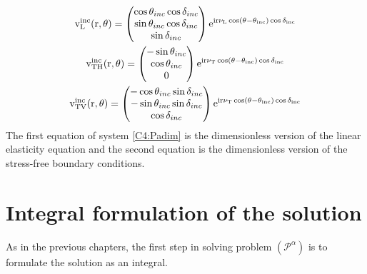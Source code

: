\begin{multline}
\rm v_L^{inc}(r,\theta)=\begin{pmatrix}
\cos \theta_{inc}\cos\delta_{inc} \\
\sin \theta_{inc}\cos\delta_{inc} \\
\sin\delta_{inc}
\end{pmatrix} e^{ir\nu_L \cos(\theta-\theta_{inc})\cos\delta_{inc}}
\\
\rm v_{TH}^{inc}(r,\theta)=\begin{pmatrix}
-\sin \theta_{inc} \\
\cos \theta_{inc} \\
0
\end{pmatrix} e^{ir\nu_T \cos(\theta-\theta_{inc})\cos\delta_{inc}} 
\\
\rm v_{TV}^{inc}(r,\theta)=\begin{pmatrix}
-\cos\theta_{inc}\sin\delta_{inc} \\
-\sin\theta_{inc}\sin\delta_{inc} \\
\cos\delta_{inc}
\end{pmatrix} e^{ir\nu_T \cos(\theta-\theta_{inc})\cos\delta_{inc}} 
\label{C4:vinc}
\end{multline}
 The first equation of system \eqref{C4:Padim} is the dimensionless version of the linear elasticity equation and the second equation is the dimensionless version of the stress-free boundary conditions.

\section{Integral formulation of the solution}
As in the previous chapters, the first step in solving problem $(\mathcal{P}^{\alpha})$ is to formulate the solution as an integral. 
